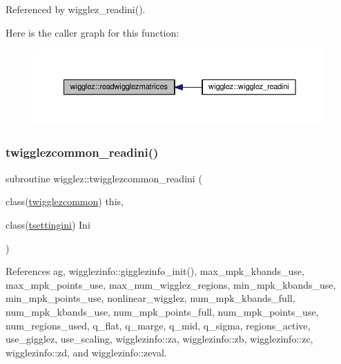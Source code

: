 Referenced by wigglez\+\_\+readini().

Here is the caller graph for this function\+:
\nopagebreak
\begin{figure}[H]
\begin{center}
\leavevmode
\includegraphics[width=350pt]{namespacewigglez_af7eacad18112700eeba576ce8376cb89_icgraph}
\end{center}
\end{figure}
\mbox{\label{namespacewigglez_a0ccc7d6e7495d4d98fe5df0ae058145a}} 
\subsubsection{\texorpdfstring{twigglezcommon\+\_\+readini()}{twigglezcommon\_readini()}}
{\footnotesize\ttfamily subroutine wigglez\+::twigglezcommon\+\_\+readini (\begin{DoxyParamCaption}\item[{class(\mbox{\hyperlink{structwigglez_1_1twigglezcommon}{twigglezcommon}})}]{this,  }\item[{class(\mbox{\hyperlink{structsettings_1_1tsettingini}{tsettingini}})}]{Ini }\end{DoxyParamCaption})\hspace{0.3cm}{\ttfamily [private]}}



References ag, wigglezinfo\+::gigglezinfo\+\_\+init(), max\+\_\+mpk\+\_\+kbands\+\_\+use, max\+\_\+mpk\+\_\+points\+\_\+use, max\+\_\+num\+\_\+wigglez\+\_\+regions, min\+\_\+mpk\+\_\+kbands\+\_\+use, min\+\_\+mpk\+\_\+points\+\_\+use, nonlinear\+\_\+wigglez, num\+\_\+mpk\+\_\+kbands\+\_\+full, num\+\_\+mpk\+\_\+kbands\+\_\+use, num\+\_\+mpk\+\_\+points\+\_\+full, num\+\_\+mpk\+\_\+points\+\_\+use, num\+\_\+regions\+\_\+used, q\+\_\+flat, q\+\_\+marge, q\+\_\+mid, q\+\_\+sigma, regions\+\_\+active, use\+\_\+gigglez, use\+\_\+scaling, wigglezinfo\+::za, wigglezinfo\+::zb, wigglezinfo\+::zc, wigglezinfo\+::zd, and wigglezinfo\+::zeval.

